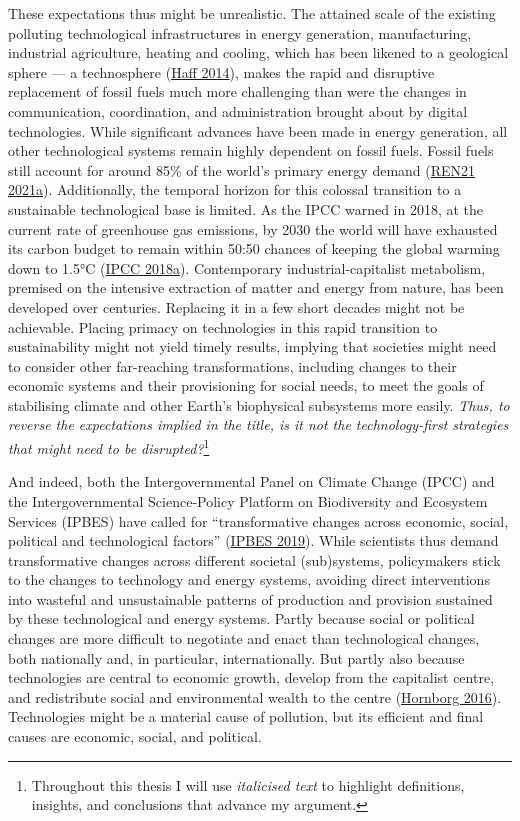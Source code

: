\documentclass[a4paper, nobind]{templates/ociamthesis}
\begin{document}
These expectations thus might be unrealistic. The attained scale of the existing polluting technological infrastructures in energy generation, manufacturing, industrial agriculture, heating and cooling, which has been likened to a geological sphere --- a technosphere (\protect\hyperlink{ref-haff_technology_2014}{Haff 2014}), makes the rapid and disruptive replacement of fossil fuels much more challenging than were the changes in communication, coordination, and administration brought about by digital technologies. While significant advances have been made in energy generation, all other technological systems remain highly dependent on fossil fuels. Fossil fuels still account for around 85\% of the world's primary energy demand (\protect\hyperlink{ref-ren21_five_2021}{REN21 2021a}). Additionally, the temporal horizon for this colossal transition to a sustainable technological base is limited. As the IPCC warned in 2018, at the current rate of greenhouse gas emissions, by 2030 the world will have exhausted its carbon budget to remain within 50:50 chances of keeping the global warming down to 1.5°C (\protect\hyperlink{ref-ipcc_global_2018}{IPCC 2018a}). Contemporary industrial-capitalist metabolism, premised on the intensive extraction of matter and energy from nature, has been developed over centuries. Replacing it in a few short decades might not be achievable. Placing primacy on technologies in this rapid transition to sustainability might not yield timely results, implying that societies might need to consider other far-reaching transformations, including changes to their economic systems and their provisioning for social needs, to meet the goals of stabilising climate and other Earth's biophysical subsystems more easily. \emph{Thus, to reverse the expectations implied in the title, is it not the technology-first strategies that might need to be disrupted?}\footnote{Throughout this thesis I will use \emph{italicised text} to highlight definitions, insights, and conclusions that advance my argument.}

And indeed, both the Intergovernmental Panel on Climate Change (IPCC) and the Intergovernmental Science-Policy Platform on Biodiversity and Ecosystem Services (IPBES) have called for ``transformative changes across economic, social, political and technological factors'' (\protect\hyperlink{ref-ipbes_global_2019}{IPBES 2019}). While scientists thus demand transformative changes across different societal (sub)systems, policymakers stick to the changes to technology and energy systems, avoiding direct interventions into wasteful and unsustainable patterns of production and provision sustained by these technological and energy systems. Partly because social or political changes are more difficult to negotiate and enact than technological changes, both nationally and, in particular, internationally. But partly also because technologies are central to economic growth, develop from the capitalist centre, and redistribute social and environmental wealth to the centre (\protect\hyperlink{ref-hornborg_global_2016}{Hornborg 2016}). Technologies might be a material cause of pollution, but its efficient and final causes are economic, social, and political.
\end{document}
